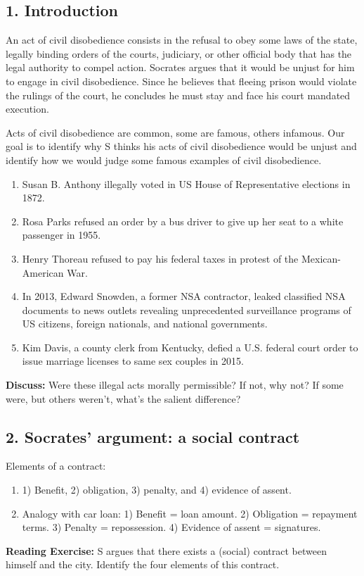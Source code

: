 \documentclass[oneside]{article}
\begin{document}
\subsection*{1. Introduction}

An act of civil disobedience consists in the refusal to obey some laws of the state, legally binding orders of the courts, judiciary, or other official body that has the  legal authority to compel action. Socrates argues that it would be unjust for him to engage in civil disobedience. Since he believes that fleeing prison would violate the rulings of the court, he concludes he must stay and face his court mandated execution.

Acts of civil disobedience are common, some are famous, others infamous. Our goal is to identify why S thinks his acts of civil disobedience would be unjust and identify how we would judge some famous examples of civil disobedience. 

\begin{enumerate}
\item Susan B. Anthony illegally voted in US House of Representative elections in 1872. 
\item Rosa Parks refused an order by a bus driver to give up her seat to a white passenger in 1955.
  \item Henry Thoreau refused to pay his federal taxes in protest of the Mexican-American War.
\item   In 2013, Edward Snowden, a former NSA contractor, leaked classified NSA documents to news outlets revealing unprecedented surveillance programs of US citizens, foreign nationals, and national governments.
\item Kim Davis, a county clerk from Kentucky, defied a U.S. federal court order to issue marriage licenses to same sex couples in 2015. 

\end{enumerate}
\textbf{Discuss:} Were these illegal acts morally permissible? If not, why not? If some were, but others weren't, what's the salient difference?


\subsection*{2. Socrates' argument: a social contract}

Elements of a contract:

\begin{enumerate}
\item[ ] 1) Benefit, 2) obligation, 3) penalty, and 4) evidence of assent.
\item[ ]  Analogy with car loan:  1) Benefit = loan amount. 2) Obligation = repayment terms. 3) Penalty = repossession. 4) Evidence of assent = signatures.\end{enumerate}
\textbf{Reading Exercise:} S argues that there exists a (social) contract between himself and the city. Identify the four elements of this contract.
\end{document}

